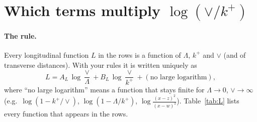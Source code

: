 \documentclass[10pt]{article}
\numberwithin{equation}{section}
\begin{document}
\section{Which terms multiply \texorpdfstring{$\log(\vee/k^+)$}{log(vee/k+)}}\label{sec:which}
\paragraph{The rule.} Every longitudinal function $L$ in the rows is a function of $\Lambda$, $k^+$ and $\vee$ (and of transverse distances). With your rules it is written uniquely as
\begin{equation}
L=A_L\,\log\frac{\vee}{\Lambda}+B_L\,\log\frac{\vee}{k^+}+(\text{no large logarithm}),
\label{eq:AB}
\end{equation}
where ``no large logarithm'' means a function that stays finite for $\Lambda\to0$, $\vee\to\infty$ (e.g.\ $\log(1-k^+/\vee)$, $\log(1-\Lambda/k^+)$, $\log\frac{(x-z)^2}{(x-w)^2}$). Table~\ref{tab:L} lists every function that appears in the rows.
\end{document}

